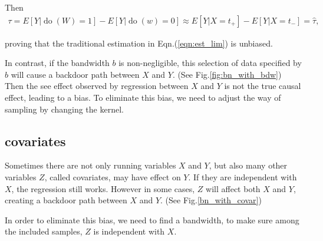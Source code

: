 \documentclass[a4 paper,12pt]{article}
\DeclareMathOperator{\Do}{do}
\begin{document}
Then
\begin{align}
   \tau=E[Y|\Do(W)=1]-E[Y|\Do(w)=0]\approx E[Y|X=t_+]-E[Y|X=t_-]=\hat\tau,
\end{align}

proving that the traditional estimation in Eqn.(\ref{eqn:est_lim}) is unbiased.

In contrast, if the bandwidth $b$ is non-negligible, this selection of data specified by $b$ will cause a backdoor path between $X$ and $Y$. (See Fig.\ref{fig:bn_with_bdw}) Then the see effect observed by regression between $X$ and $Y$ is not the true causal effect, leading to a bias. To eliminate this bias, we need to adjust the way of sampling by changing the kernel.

\subsection*{covariates}
Sometimes there are not only running variables $X$ and $Y$, but also many other variables $Z$, called covariates, may have effect on $Y$. If they are independent with $X$, the regression still works. However in some cases, $Z$ will affect both $X$ and $Y$, creating a backdoor path between $X$ and $Y$. (See Fig.\ref{bn_with_covar})

In order to eliminate this bias, we need to find a bandwidth, to make sure among the included samples, $Z$ is independent with $X$.
\end{document}
